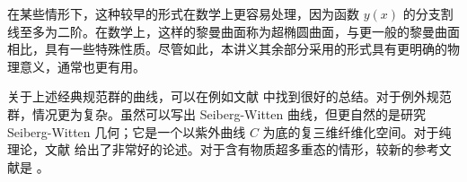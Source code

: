 在某些情形下，这种较早的形式在数学上更容易处理，因为函数 $y(x)$ 的分支割线至多为二阶。在数学上，这样的黎曼曲面称为超椭圆曲面，与更一般的黎曼曲面相比，具有一些特殊性质。尽管如此，本讲义其余部分采用的形式具有更明确的物理意义，通常也更有用。

关于上述经典规范群的曲线，可以在例如文献 \cite{Nekrasov:2004vw} 中找到很好的总结。对于例外规范群，情况更为复杂。虽然可以写出 Seiberg-Witten 曲线，但更自然的是研究 Seiberg-Witten 几何；它是一个以紫外曲线 $C$ 为底的复三维纤维化空间。对于纯理论，文献 \cite{Hollowood:1997pp} 给出了非常好的论述。对于含有物质超多重态的情形，较新的参考文献是 \cite{Tachikawa:2011yr}。
